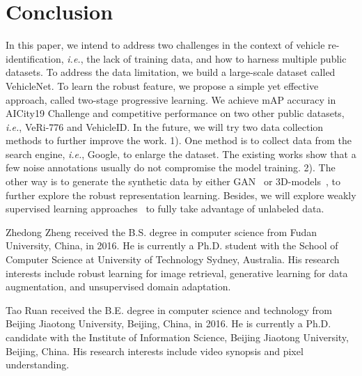 \documentclass[journal]{IEEEtran}
\def\ie{\emph{i.e.}}
\begin{document}
\section{Conclusion} \label{sec:conclusion}
In this paper, we intend to address two challenges in the context of vehicle re-identification, \ie, the lack of training data, and how to harness multiple public datasets. To address the data limitation, we build a large-scale dataset called VehicleNet. To learn the robust feature, we propose a simple yet  effective approach, called two-stage progressive learning. We achieve  mAP accuracy in AICity19 Challenge and competitive performance on two other public datasets, \ie, VeRi-776 and VehicleID.
In the future, we will try two data collection methods to further improve the work. 1). One method is to collect data from the search engine, \ie, Google, to enlarge the dataset. The existing works \cite{krause2016unreasonable,zheng2020university} show that a few noise annotations usually do not compromise the model training. 2). The other way is to generate the synthetic data by either GAN~\cite{goodfellow2014generative} or 3D-models~\cite{yao2019simulating}, to further explore the robust representation learning. Besides, we will explore weakly supervised learning approaches~\cite{zhang2019leveraging,zhang2018spftn,meng2019weakly} to fully take advantage of unlabeled data.












\ifCLASSOPTIONcaptionsoff
  \newpage
\fi






\begin{IEEEbiography}
{Zhedong Zheng}
received the B.S. degree in computer science from Fudan University, China, in 2016. He is currently a Ph.D. student with the School of Computer Science at University of Technology Sydney, Australia. His research interests include robust learning for image retrieval, generative learning for data augmentation, and unsupervised domain adaptation.
\end{IEEEbiography}

\vfill
\begin{IEEEbiography}
{Tao Ruan} received the B.E. degree in computer science and technology from Beijing Jiaotong University, Beijing, China, in 2016. He is currently a Ph.D. candidate with the Institute of Information Science, Beijing Jiaotong University, Beijing, China. His research interests include video synopsis and pixel understanding.
\end{IEEEbiography}
\end{document}

